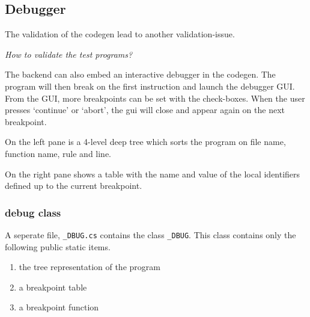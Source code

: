 \subsection{Debugger}
The validation of the codegen lead to another validation-issue.

\textit{How to validate the test programs?}


The backend can also embed an interactive debugger in the codegen.
The program will then break on the first instruction and launch the debugger GUI.
From the GUI, more breakpoints can be set with the check-boxes.
When the user presses `continue' or `abort', the gui will close and appear again on the next breakpoint.

On the left pane is a 4-level deep tree which sorts the program on file name, function name, rule and line.

On the right pane shows a table with the name and value of the local identifiers defined up to the current breakpoint.

\subsubsection{debug class}

A seperate file, \verb|_DBUG.cs| contains the class \verb|_DBUG|.
This class contains only the following public static items.

\begin{enumerate}
    \item the tree representation of the program
    \item a breakpoint table
    \item a breakpoint function
\end{enumerate}

